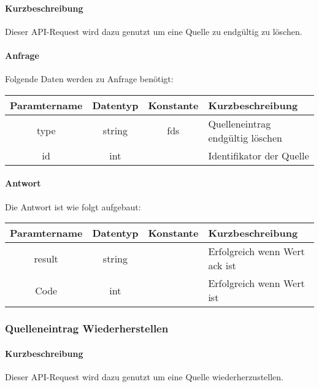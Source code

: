 \paragraph{Kurzbeschreibung}Dieser API-Request wird dazu genutzt um eine Quelle zu endgültig zu löschen.
\paragraph{Anfrage}Folgende Daten werden zu Anfrage benötigt:
\begin{table}[H]
	\begin{tabular}{|c|c|c|p{6.5cm}|}
		\hline
		\textbf{Paramtername} & \textbf{Datentyp} & \textbf{Konstante} & \textbf{Kurzbeschreibung}                                                                                               \\ \hline
		type                & string            & fds                & Quelleneintrag endgültig löschen \\ \hline
		id                  & int               &                    & Identifikator der Quelle \\ \hline
	\end{tabular}
\end{table}
\paragraph{Antwort}Die Antwort ist wie folgt aufgebaut:
\begin{table}[H]
	\begin{tabular}{|c|c|c|p{6.5cm}|}
		\hline
		\textbf{Paramtername} & \textbf{Datentyp} & \textbf{Konstante} & \textbf{Kurzbeschreibung}                                                                                               \\ \hline
		result              & string           &                 & Erfolgreich wenn Wert {\glqq ack\grqq} ist \\ \hline
		Code                & int              &                 & Erfolgreich wenn Wert {\glqq 0\grqq} ist \\ \hline
	\end{tabular}
\end{table}
\subsubsection{Quelleneintrag Wiederherstellen}
\paragraph{Kurzbeschreibung}Dieser API-Request wird dazu genutzt um eine Quelle wiederherzustellen.
